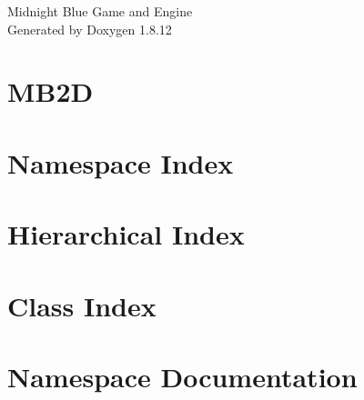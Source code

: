 \documentclass[twoside]{book}
\newcommand{\+}{\discretionary{\mbox{\scriptsize$\hookleftarrow$}}{}{}}
\newcommand{\clearemptydoublepage}{%
  \newpage{\pagestyle{empty}\cleardoublepage}%
}
\begin{document}
\hypersetup{pageanchor=false,
             bookmarksnumbered=true,
             pdfencoding=unicode
            }
\begin{titlepage}
\vspace*{7cm}
\begin{center}%
{\Large Midnight Blue Game and Engine }\\
\vspace*{1cm}
{\large Generated by Doxygen 1.8.12}\\
\end{center}
\end{titlepage}
\clearemptydoublepage
{}
\tableofcontents
\clearemptydoublepage
{}
\hypersetup{pageanchor=true}

\chapter{M\+B2D}
\label{index}\hypertarget{index}{}
\chapter{Namespace Index}

\chapter{Hierarchical Index}

\chapter{Class Index}

\chapter{Namespace Documentation}











\end{document}
